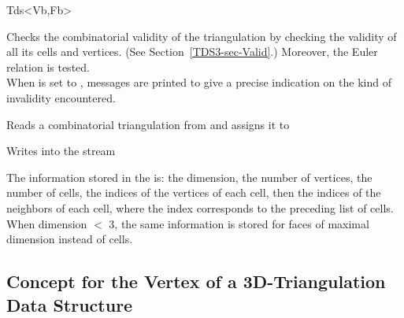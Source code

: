 \begin{ccClassTemplate}{Tds<Vb,Fb>}
\begin{ccAdvanced}

{Checks the combinatorial validity of the triangulation by checking
the validity of all its cells and vertices. 
(See Section~\ref{TDS3-sec-Valid}.) Moreover, the Euler relation is
tested.\\ 
When  is set to , messages are printed to give
a precise indication on the kind of invalidity encountered.}
\end{ccAdvanced}


{Reads a combinatorial triangulation from  and assigns it to }

{Writes  into the stream }

The information stored in the  is: 
the dimension, the number of vertices, the number of cells,
the indices of the vertices of each cell, then the indices of the
neighbors of each cell, where the index corresponds to the preceding
list of cells. When dimension $<$ 3, the same information is stored
for faces of maximal dimension instead of cells.

	\end{ccClassTemplate} 

	\subsection{Concept for the Vertex of a 3D-Triangulation Data Structure} 
	\label{TDS3-sec-concept-Tds_Vertex}

